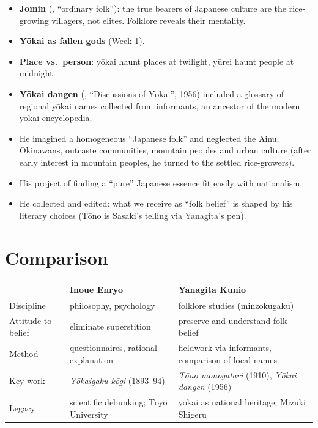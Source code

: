 \begin{itemize}
  \item \textbf{Jōmin} (, ``ordinary folk''): the true bearers of Japanese culture
        are the rice-growing villagers, not elites. Folklore reveals their mentality.
  \item \textbf{Yōkai as fallen gods} (Week 1).
  \item \textbf{Place vs.\ person}: yōkai haunt places at twilight, yūrei haunt people at
        midnight.
  \item \textbf{Yōkai dangen} (, ``Discussions of Yōkai'', 1956) included a
        glossary of regional yōkai names collected from informants, an ancestor of the
        modern yōkai encyclopedia.
\end{itemize}

\begin{important}
\begin{itemize}
  \item He imagined a homogeneous ``Japanese folk'' and neglected the Ainu, Okinawans,
        outcaste communities, mountain peoples and urban culture (after early interest in
        mountain peoples, he turned to the settled rice-growers).
  \item His project of finding a ``pure'' Japanese essence fit easily with nationalism.
  \item He collected and edited: what we receive as ``folk belief'' is shaped by his
        literary choices (Tōno is Sasaki's telling via Yanagita's pen).
\end{itemize}
\end{important}

\section{Comparison}

\begin{center}
\begin{tabular}{p{3.2cm}p{4.8cm}p{4.8cm}}
\toprule
 & Inoue Enryō & Yanagita Kunio \\
\midrule
Discipline & philosophy, psychology & folklore studies (minzokugaku) \\
Attitude to belief & eliminate superstition & preserve and understand folk belief \\
Method & questionnaires, rational explanation & fieldwork via informants, comparison of local names \\
Key work & \emph{Yōkaigaku kōgi} (1893--94) & \emph{Tōno monogatari} (1910), \emph{Yōkai dangen} (1956) \\
Legacy & scientific debunking; Tōyō University & yōkai as national heritage; Mizuki Shigeru \\
\bottomrule
\end{tabular}
\end{center}

